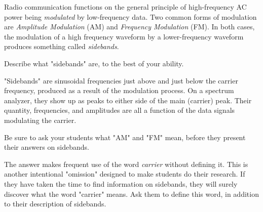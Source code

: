 

Radio communication functions on the general principle of high-frequency AC power being {\it modulated} by low-frequency data.  Two common forms of modulation are {\it Amplitude Modulation} (AM) and {\it Frequency Modulation} (FM).  In both cases, the modulation of a high frequency waveform by a lower-frequency waveform produces something called {\it sidebands}.

Describe what "sidebands" are, to the best of your ability.







"Sidebands" are sinusoidal frequencies just above and just below the carrier frequency, produced as a result of the modulation process.  On a spectrum analyzer, they show up as peaks to either side of the main (carrier) peak.  Their quantity, frequencies, and amplitudes are all a function of the data signals modulating the carrier.







Be sure to ask your students what "AM" and "FM" mean, before they present their answers on sidebands.

The answer makes frequent use of the word {\it carrier} without defining it.  This is another intentional "omission" designed to make students do their research.  If they have taken the time to find information on sidebands, they will surely discover what the word "carrier" means.  Ask them to define this word, in addition to their description of sidebands.




